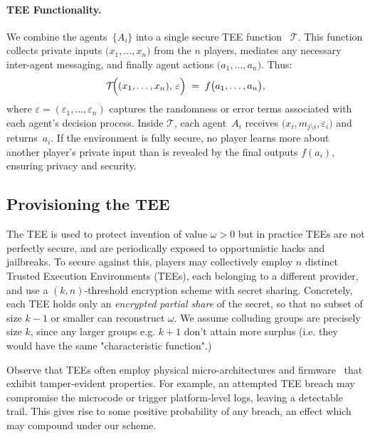 \documentclass{article}
\begin{document}
\paragraph{TEE Functionality.}
We combine the agents~\(\{A_i\}\) into a single secure TEE function
~\(\mathcal{T}\). This function collects private inputs
\(\bigl(x_1,\dots,x_n\bigr)\) from the \(n\) players, mediates any necessary
inter-agent messaging, and finally agent actions \(\bigl(a_1,\dots,a_n\bigr)\).
Thus:
\[
  \mathcal{T}\!\Bigl((x_1,\dots,x_n),\,\varepsilon\Bigr)
  \;=\;
  f\bigl(a_1,\dots,a_n\bigr),
\]
where \(\varepsilon = (\varepsilon_1,\dots,\varepsilon_n)\) captures the
randomness or error terms associated with each agent's decision process.
Inside \(\mathcal{T}\), each agent~\(A_i\) receives \(\bigl(x_i,m_{j\setminus i},\varepsilon_i\bigr)\) and returns~\(a_i\). If the environment is fully secure, no player learns more about another player's private input than is revealed by the final outputs $f(a_i)$, ensuring privacy and security.

\subsection{Provisioning the TEE}
The TEE is used to protect invention of value \(\omega > 0\) but in practice TEEs are not perfectly secure, and are periodically exposed to opportunistic hacks and jailbreaks. To secure against this, players may collectively employ \(n\) distinct Trusted Execution Environments (TEEs), each belonging to a different provider, and use a \((k,n)\)-threshold encryption scheme with secret sharing. Concretely, each TEE holds only an \emph{encrypted partial share} of the secret, so that no subset of size \(k-1\) or smaller can reconstruct \(\omega\). We assume colluding groups are precisely size $k$, since any larger groups e.g. $k+1$ don't attain more surplus (i.e. they would have the same "characteristic function".)

Observe that TEEs often employ physical micro-architectures and firmware~\citep{costan2016sgx,arm2020security} that exhibit tamper‐evident
properties. For example, an attempted TEE breach may compromise the microcode
or trigger platform‐level logs, leaving a detectable trail. This gives rise to some positive probability of any breach, an effect which may compound under our scheme. 
\end{document}
